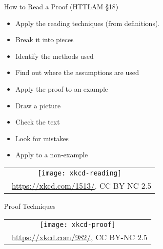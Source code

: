 \begin{frame}{How to Read a Proof (HTTLAM \S18)}

	\begin{itemize}
	
		\item Apply the reading techniques (from definitions).
		
		\item Break it into pieces
		
		\item Identify the methods used
		
		\item Find out where the assumptions are used
		
		\item Apply the proof to an example
		
		\item Draw a picture
		
		\item Check the text
		
		\item Look for mistakes
		
		\item Apply to a non-example

	\end{itemize}

\begin{center}
		\begin{tabular}{c}
		\texttt{[image: xkcd-reading]}\\[-1ex]
		{\tiny \textcopyright~\url{https://xkcd.com/1513/}, CC BY-NC 2.5}
		\end{tabular}
		\end{center}

\end{frame}

\begin{frame}{Proof Techniques}

\begin{center}

\begin{tabular}{c}
		\texttt{[image: xkcd-proof]}\\[-1ex]
		{\tiny \textcopyright~\url{https://xkcd.com/982/}, CC BY-NC 2.5}
		\end{tabular}
		\end{center}

\end{frame}

